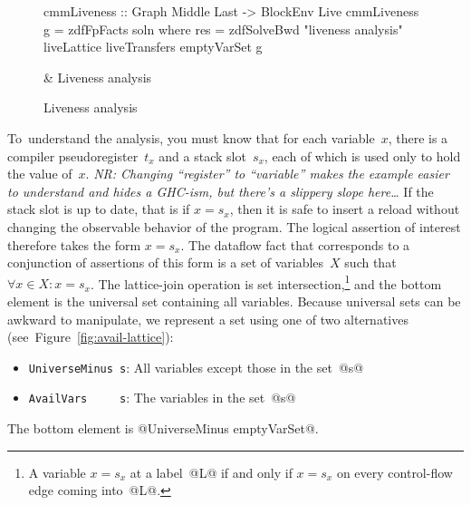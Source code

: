 \documentclass[blockstyle,preprint,nocopyrightspace]{sigplanconf}
\newcommand\slotof[1]{\ensuremath{s_{#1}}}
\newcommand\tempof[1]{\ensuremath{t_{#1}}}
\newcommand{\authornote}[1]{{\em #1}}
\newcommand{\norman}[1]{\authornote{NR: #1}}
\let\remark\norman
\newcommand\figref[1]{Figure~\ref{fig:#1}}
\newcommand\figlabel[1]{\label{fig:#1}}
\begin{document}
\begin{figure*}
\begin{codetable}
\T\begin{code}
cmmLiveness :: Graph Middle Last -> BlockEnv Live
cmmLiveness g = zdfFpFacts soln
    where res = zdfSolveBwd "liveness analysis" liveLattice liveTransfers emptyVarSet g
\end{code}\B
& Liveness \mbox{analysis}\\
\end{codetable}
\caption{Liveness analysis}
\figlabel{liveness-all}
\figlabel{liveness}
\figlabel{live-lattice}
\figlabel{live-transfers}
\figlabel{live-running}
\end{figure*}
%
%



To~understand the analysis, you must know that for each variable~$x$,
there is a compiler pseudoregister~\tempof x and a stack slot~\slotof x, each of
which is used only to hold the value of~$x$.
%
\remark{Changing ``register'' to
``variable'' makes the example easier to understand and hides a
GHC-ism, but there's a slippery slope here\ldots}
%
If the stack slot is up to date, that is if $x = \slotof x$,
then it is safe to insert a reload without changing the observable
behavior of the program.
The logical assertion of interest therefore takes the form $x = \slotof x$.
The dataflow fact that corresponds to a conjunction of assertions of
this form is a set of variables~$X$ such that $\forall x \in X \mathrel
: x = \slotof x$.
The lattice-join operation is set intersection,\footnote
{A variable $x = \slotof x$ at a label~@L@ if and
only if $x = \slotof x$ on every control-flow edge coming into~@L@.}
and the bottom element
is the universal set containing all variables.
Because universal sets can be awkward to manipulate, we represent a
set using one of two alternatives
(see~\figref{avail-lattice}):
\begin{itemize}
\item \texttt{UniverseMinus~s}: All variables except those in the set~@s@
\item \texttt{AvailVars~~~~~s}: The variables in the set~@s@
\end{itemize}
The bottom element is @UniverseMinus emptyVarSet@.




\end{document}
